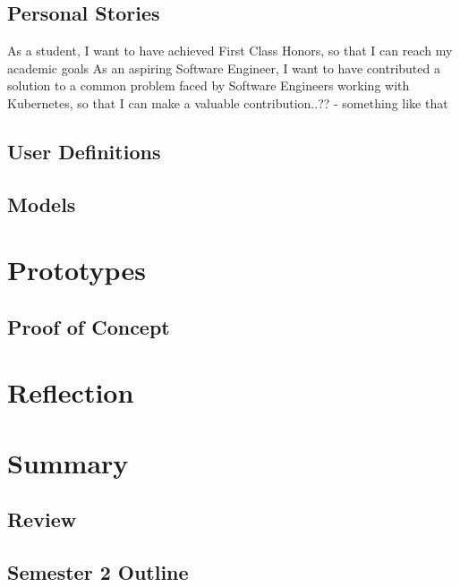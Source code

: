 \documentclass{article}
\begin{document}
\subsection{Personal Stories}
As a student, I want to have achieved First Class Honors, so that I can reach my academic goals
As an aspiring Software Engineer, I want to have contributed a solution to a common problem faced by Software Engineers working with Kubernetes, so that I can make a valuable contribution..?? - something like that



\subsection{User Definitions}



\subsection{Models}



\section{Prototypes}



\subsection{Proof of Concept}



\section{Reflection}



\section{Summary}



\subsection{Review}



\subsection{Semester 2 Outline}
\end{document}

